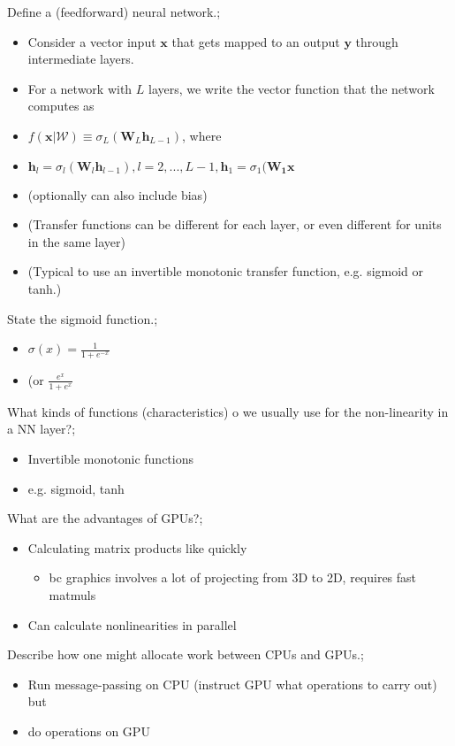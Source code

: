 \documentclass{article}
\begin{document}
Define a (feedforward) neural network.; \begin{itemize}
    \item Consider a vector input $\bm{x}$ that gets mapped to an output $\bm{y}$ through intermediate layers.
    \item For a network with $L$ layers, we write the vector function that the network computes as 
    \item $f(\bm{x}|\mathcal{W})\equiv \sigma_L(\bm{W}_L\bm{h}_{L-1})$, where
    \item $\bm{h}_l = \sigma_l(\bm{W}_l\bm{h}_{l-1}), l=2,...,L-1, \bm{h}_1 = \sigma_1(\bm{W_1x}$
    \item (optionally can also include bias)
    \item (Transfer functions can be different for each layer, or even different for units in the same layer)
    \item (Typical to use an invertible monotonic transfer function, e.g. sigmoid or tanh.)
\end{itemize}

State the sigmoid function.; \begin{itemize}
    \item $\sigma(x) = \frac{1}{1 + e^{-x}}$
    \item (or $\frac{e^x}{1+e^x}$
\end{itemize}

What kinds of functions (characteristics) o we usually use for the non-linearity in a NN layer?; \begin{itemize}
    \item Invertible monotonic functions
    \item e.g. sigmoid, tanh
\end{itemize}

What are the advantages of GPUs?; \begin{itemize}
    \item Calculating matrix products like  quickly
    \begin{itemize}
        \item bc graphics involves a lot of projecting from 3D to 2D, requires fast matmuls
    \end{itemize}
    \item Can calculate nonlinearities in parallel
\end{itemize}

Describe how one might allocate work between CPUs and GPUs.; \begin{itemize}
    \item Run message-passing on CPU (instruct GPU what operations to carry out) but
    \item do operations on GPU
\end{itemize}
\end{document}
